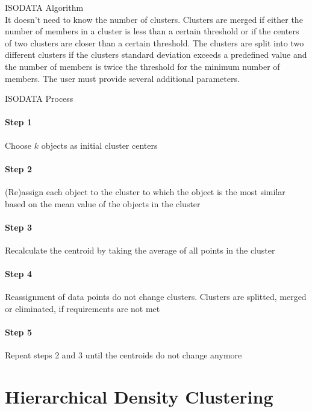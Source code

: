 \begin{concept}{ISODATA Algorithm}\\
It doesn't need to know the number of clusters. Clusters are merged if either the number of members in a cluster is less than a certain threshold or if the centers of two clusters are closer than a certain threshold. The clusters are split into two different clusters if the clusters standard deviation exceeds a predefined value and the number of members is twice the threshold for the minimum number of members. The user must provide several additional parameters.
\end{concept}

\begin{KR}{ISODATA Process}\\
\paragraph{Step 1}
Choose $k$ objects as initial cluster centers

\paragraph{Step 2}
(Re)assign each object to the cluster to which the object is the most similar based on the mean value of the objects in the cluster

\paragraph{Step 3}
Recalculate the centroid by taking the average of all points in the cluster

\paragraph{Step 4}
Reassignment of data points do not change clusters. Clusters are splitted, merged or eliminated, if requirements are not met

\paragraph{Step 5}
Repeat steps 2 and 3 until the centroids do not change anymore
\end{KR}

\section{Hierarchical Density Clustering}

